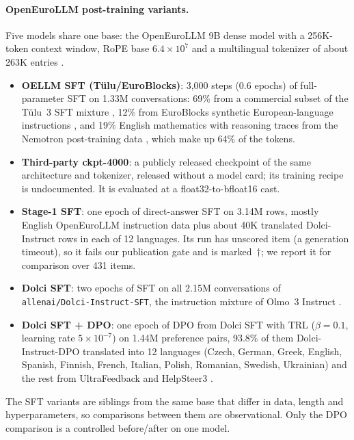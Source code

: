 \documentclass[11pt]{article}
\begin{document}
\paragraph{OpenEuroLLM post-training variants.} Five models share one base: the OpenEuroLLM 9B dense model with a 256K-token context window, RoPE base $6.4\times10^7$ and a multilingual tokenizer of about 263K entries \citep{openeurollm2025}.
\begin{itemize}
\item \textbf{OELLM SFT (Tülu/EuroBlocks)}: 3{,}000 steps (0.6 epochs) of full-parameter SFT on 1.33M conversations: 69\% from a commercial subset of the Tülu~3 SFT mixture \citep{lambert2024tulu3}, 12\% from EuroBlocks synthetic European-language instructions \citep{euroblocks,martins2025eurollm}, and 19\% English mathematics with reasoning traces from the Nemotron post-training data \citep{nemotronposttraining}, which make up 64\% of the tokens.
\item \textbf{Third-party ckpt-4000}: a publicly released checkpoint of the same architecture and tokenizer, released without a model card; its training recipe is undocumented. It is evaluated at a float32-to-bfloat16 cast.
\item \textbf{Stage-1 SFT}: one epoch of direct-answer SFT on 3.14M rows, mostly English OpenEuroLLM instruction data plus about 40K translated Dolci-Instruct rows in each of 12 languages. Its run has \stageoneMissing{} unscored item (a generation timeout), so it fails our publication gate and is marked~$\dagger$; we report it for comparison over 431 items.
\item \textbf{Dolci SFT}: two epochs of SFT on all 2.15M conversations of \texttt{allenai/Dolci-Instruct-SFT}, the instruction mixture of Olmo~3 Instruct \citep{olmo2025olmo3}.
\item \textbf{Dolci SFT + DPO}: one epoch of DPO \citep{rafailov2023dpo} from Dolci SFT with TRL \citep{vonwerra2020trl} ($\beta=0.1$, learning rate $5\times10^{-7}$) on 1.44M preference pairs, 93.8\% of them Dolci-Instruct-DPO translated into 12 languages \citep{dolcitranslated} (Czech, German, Greek, English, Spanish, Finnish, French, Italian, Polish, Romanian, Swedish, Ukrainian) and the rest from UltraFeedback and HelpSteer3 \citep{cui2024ultrafeedback,wang2025helpsteer3}.
\end{itemize}
The SFT variants are siblings from the same base that differ in data, length and hyperparameters, so comparisons between them are observational. Only the DPO comparison is a controlled before/after on one model.
\end{document}
